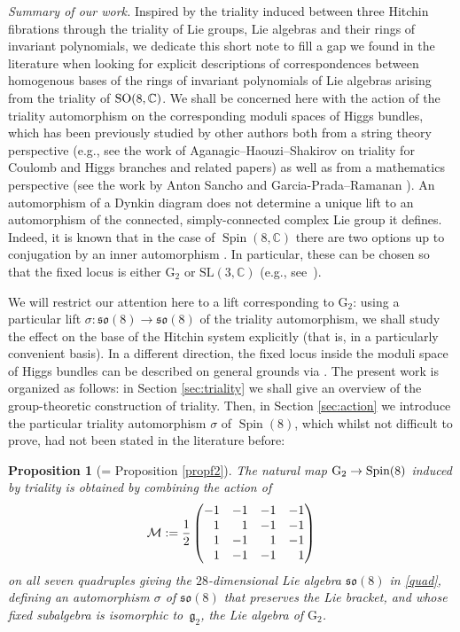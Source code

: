 \documentclass[10pt,a4paper]{amsart}
\numberwithin{equation}{section}
\def\C{{\mathbb C}}
\newcommand{\SL}{{\mathrm{SL}}}
\newcommand{\GG}{{\rm G}_2}
\newtheorem{Proposition}[Theorem]{Proposition}
 { \theoremstyle{definition}
\newtheorem{Definition}[Theorem]{Definition}
\newtheorem{Remark}[Theorem]{Remark} }
\begin{document}
{\it Summary of our work.} Inspired by the triality induced between three Hitchin fibrations through the triality of Lie groups, Lie algebras and their rings of invariant polynomials, we dedicate this short note to fill a gap we found in the literature when looking for explicit descriptions of correspondences between homogenous bases of the rings of invariant polynomials of Lie algebras arising from the triality of ${\rm SO}(8,\mathbb{C})$. We shall be concerned here with the action of the triality automorphism on the corresponding moduli spaces of Higgs bundles, which has been previously studied by other authors both from a string theory perspective (e.g., see the work of Aganagic--Haouzi--Shakirov \cite{mina} on triality for Coulomb and Higgs branches and related papers) as well as from a mathematics perspective (see the work by Anton Sancho \cite{anton} and Garcia-Prada--Ramanan \cite{oscar}). An automorphism of a Dynkin diagram does not determine a unique lift to an automorphism of the connected, simply-connected complex Lie group it defines. Indeed, it is known that in the case of $\operatorname{Spin}(8, \mathbb{C})$ there are two options up to conjugation by an inner automorphism \cite{wolf-gray}. In particular, these can be chosen so that the fixed locus is either $\mathrm{G}_2$ or $\SL (3, \C )$ (e.g., see~\cite{anton,oscar}).

We will restrict our attention here to a lift corresponding to $\mathrm{G}_2$: using a particular lift $\sigma\colon \mathfrak{so}(8) \to \mathfrak{so}(8)$ of the triality automorphism, we shall study the effect on the base of the Hitchin system explicitly (that is, in a particularly convenient basis). In a different direction, the fixed locus inside the moduli space of Higgs bundles can be described on general grounds via \cite{oscar}. The present work is organized as follows: in Section \ref{sec:triality} we shall give an overview of the group-theoretic construction of triality. Then, in Section \ref{sec:action} we introduce the particular triality automorphism $\sigma$ of $\operatorname{Spin}(8)$, which whilst not difficult to prove, had not been stated in the literature before:

\begin{Proposition}[= Proposition \ref{propf2}] The natural map $\GG \rightarrow \rm Spin(8)$ induced by triality is obtained by combining the action of \begin{equation*}\mathcal{M} := \frac{1}{2} \begin{pmatrix}
-1 & -1 & -1 & -1 \\
\hphantom{-}1 & \hphantom{-}1 & -1 & -1 \\
\hphantom{-}1 & -1 & \hphantom{-}1 & -1 \\
\hphantom{-}1 & -1 & -1 & \hphantom{-}1
\end{pmatrix}
\end{equation*} on all seven quadruples giving the $28$-dimensional Lie algebra $\mathfrak{so}(8)$ in \eqref{quad}, defining an automorphism $\sigma$ of $\mathfrak{so}(8)$ that preserves the Lie bracket, and whose fixed subalgebra is isomorphic to~$\mathfrak{g}_2$, the Lie algebra of $\mathrm{G}_2$.
\end{Proposition}
\end{document}
